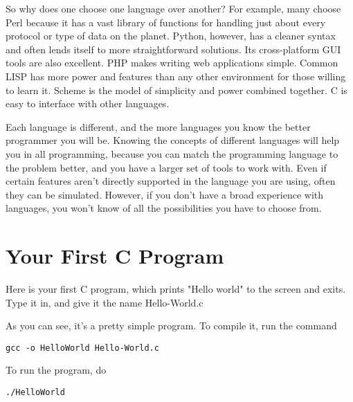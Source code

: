 So why does one choose one language over another?
For example, many choose Perl because it has a vast library of functions
for handling just about every protocol or type of data on the planet.
Python, however, has a cleaner syntax and often lends itself to more 
straightforward solutions.  Its cross-platform GUI tools are also excellent.  
PHP makes writing web applications simple.  Common LISP has more power and
features than any other environment for those willing to learn it.  Scheme is
the model of simplicity and power combined together.  C is easy to interface
with other languages.

Each language is different, and the more 
languages you know the better programmer you will be.  Knowing the
concepts of different languages will help you in all programming, because
you can match the programming language to the problem better, and you
have a larger set of tools to work with.  Even if certain features aren't
directly supported in the language you are using, often they can be simulated.
However, if you don't have a broad experience with languages, you won't
know of all the possibilities you have to choose from.

\section{Your First C Program}

Here is your first C program,
which prints "Hello world" to the screen and exits.  Type it in, and
give it the name Hello-World.c

\begin{simpletyping}

\end{simpletyping}

As you can see, it's a pretty simple program.  To compile it,
run the command

\begin{simpletyping}
\begin{lstlisting}
gcc -o HelloWorld Hello-World.c
\end{lstlisting}
\end{simpletyping}

To run the program, do

\begin{simpletyping}
\begin{lstlisting}
./HelloWorld
\end{lstlisting}
\end{simpletyping}


